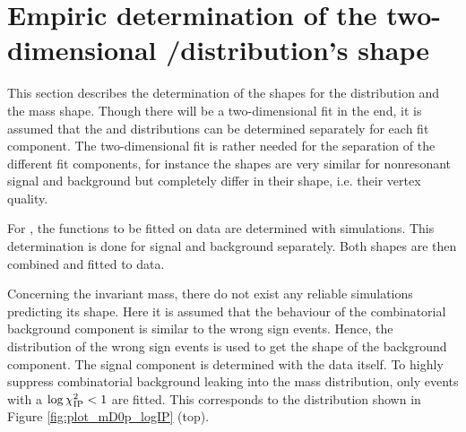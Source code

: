\section{Empiric determination of the two-dimensional \logIP/\MDp distribution's shape}
This section describes the determination of the shapes for the \logIP distribution and the \Dz\proton mass shape.
Though there will be a two-dimensional fit in the end, it is assumed that the \logIP and \MDp distributions can be determined separately for each fit component.
The two-dimensional fit is rather needed for the separation of the different fit components, for instance the \MDp shapes are very similar for nonresonant signal and background but completely differ in their \logIP shape, i.e. their vertex quality.

For \logIP, the functions to be fitted on data are determined with simulations.
This determination is done for signal and background separately.
Both shapes are then combined and fitted to data.

Concerning the invariant \Dz\proton mass, there do not exist any reliable simulations predicting its shape.
Here it is assumed that the behaviour of the combinatorial background component is similar to the wrong sign events.
Hence, the \MDp distribution of the wrong sign events is used to get the shape of the background component.
The signal component is determined with the data itself.
To highly suppress combinatorial background leaking into the \Dz\proton mass distribution, only events with a $\log \chi^2_{\text{IP}} < 1$ are fitted.
This corresponds to the distribution shown in Figure \ref{fig:plot_mD0p_logIP} (top).

